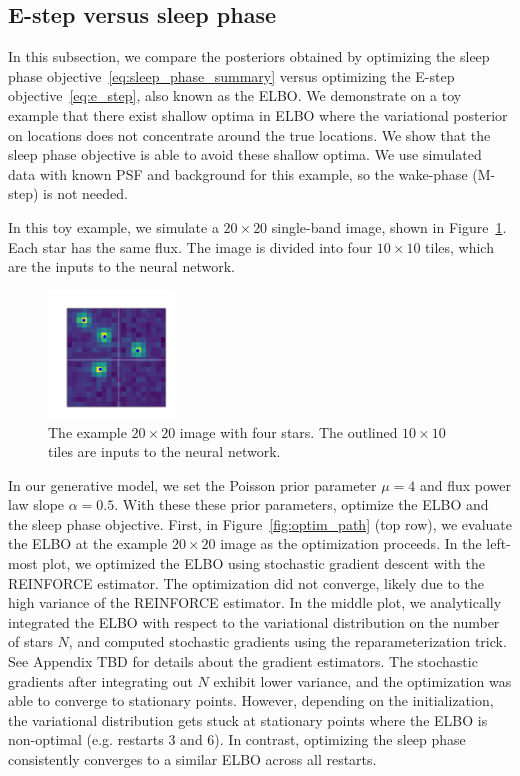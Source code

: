 \subsection{E-step versus sleep phase}
\label{sec:estep_sleep_compare}

In this subsection, we compare the posteriors obtained by optimizing the sleep phase objective~\eqref{eq:sleep_phase_summary} 
versus optimizing the E-step objective~\eqref{eq:e_step}, also known as the ELBO. 
We demonstrate on a toy example that there exist shallow optima in ELBO where the variational posterior on locations does not concentrate around the true locations. We show that the sleep phase objective is able to avoid these shallow optima. We use simulated data with known PSF and background for this example, so the wake-phase (M-step) is not needed. 

In this toy example, we simulate a $20\times20$ single-band image, shown in Figure~\ref{fig:toy_example}. Each star has the same flux. The image is divided into four $10\times 10$ tiles, which are the inputs to the neural network. 
\begin{figure}[!h]
    \centering
    \vspace{-1em}
    \includegraphics[width = 0.3\textwidth]{figures/vi_sleep_ex_figure.png}
    \vspace{-1.7em}
    \caption{The example $20\times 20$ image with four stars. The outlined $10\times 10$ tiles are inputs to the neural network. }
    \label{fig:toy_example}
\end{figure}

In our generative model, we set the Poisson prior parameter $\mu = 4$ and flux power law slope $\alpha = 0.5$. With these these prior parameters, optimize the ELBO and the sleep phase objective. First, in Figure~\ref{fig:optim_path} (top row), we evaluate the ELBO at the example $20\times 20$ image as the optimization proceeds. In the left-most plot, we optimized the ELBO using stochastic gradient descent with the REINFORCE estimator. The optimization did not converge, likely due to the high variance of the REINFORCE estimator. In the middle plot, we analytically integrated the ELBO with respect to the variational distribution on the number of stars $N$, and computed stochastic gradients using the reparameterization trick. See Appendix TBD for details about the gradient estimators. The stochastic gradients after integrating out $N$ exhibit lower variance, and the optimization was able to converge to stationary points. However, depending on the initialization, the variational distribution gets stuck at stationary points where the ELBO is non-optimal (e.g. restarts 3 and 6). In contrast, optimizing the sleep phase consistently converges to a similar ELBO across all restarts. 

